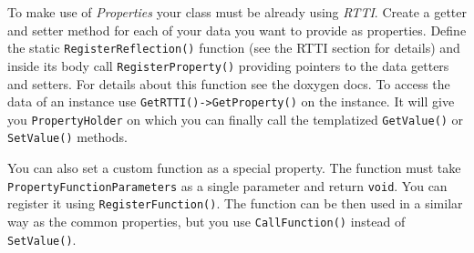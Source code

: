 To make use of \emph{Properties} your class must be already using \emph{RTTI}. Create a getter and setter method for each of your data you want to provide as properties. Define the static \verb'RegisterReflection()' function (see the RTTI section for details) and inside its body call \verb'RegisterProperty()' providing pointers to the data getters and setters. For details about this function see the doxygen docs. To access the data of an instance use \verb'GetRTTI()->GetProperty()' on the instance. It will give you \verb'PropertyHolder' on which you can finally call the templatized \verb'GetValue()' or \verb'SetValue()' methods.

You can also set a custom function as a special property. The function must take \verb'PropertyFunctionParameters' as a single parameter and return \verb'void'. You can register it using \verb'RegisterFunction()'. The function can be then used in a similar way as the common properties, but you use \verb'CallFunction()' instead of \verb'SetValue()'.


%


